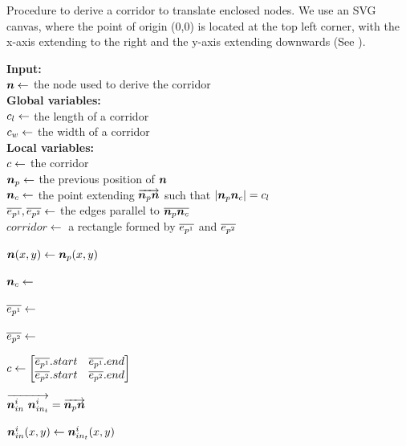 \begin{algorithm}[tb!]
    \caption{Procedure to derive a corridor to translate enclosed nodes. We use an SVG canvas, where the point of origin (0,0) is located at the top left corner, with the x-axis extending to the right and the y-axis extending downwards (See ).}\label{alg:derive corridor}

    \textbf{Input:} \\
    $ \bm{n} \gets $ the node used to derive the corridor \\

    \textbf{Global variables:} \\
    $ c_l \gets $ the length of a corridor \\
    $ c_w \gets $ the width of a corridor \\

    \textbf{Local variables:} \\
    $ c \gets $ the corridor \\
    $ \bm{n}_{p} \gets $ the previous position of $ \bm{n} $ \\
    $ \bm{n}_c \gets $ the point extending $ \protect\overrightarrow{\bm{n}_{p}\bm{n}} $ such that $ \lvert \bm{n}_{p}\bm{n}_c \rvert = c_l $\\
    $ \protect\overline{e_{p^1}}, \protect\overline{e_{p^2}} \gets $ the edges parallel to $ \protect\overline{\bm{n}_{p}\bm{n}_c} $ \\
    $ corridor \gets $ a rectangle formed by $ \protect\overline{e_{p^1}} $ and $ \protect\overline{e_{p^2}} $ \\

    \begin{algorithmic}[1]
            \State $ \bm{n}(x,y) \gets \bm{n}_{p}(x,y) $

            \State $ \bm{n}_c \gets $ 

            \State $ \protect\overline{e_{p^1}} \gets $ 

            \State $ \protect\overline{e_{p^2}} \gets $ 

            \State $ \Corridor \gets
                \begin{bmatrix}
                    \EdgeParallelA.start &
                    \EdgeParallelA.end \\

                    \EdgeParallelB.start &
                    \EdgeParallelB.end \\
                \end{bmatrix} $


                \State $ \protect\overrightarrow{\bm{n}_{in}^i ~\bm{n}_{in_t}^i} = \protect\overrightarrow{\bm{n}_{p}\bm{n}} $

                \State $ \bm{n}_{in}^i(x,y) \gets \bm{n}_{in_t}^i(x,y) $

            \EndFor
        \EndProcedure
    \end{algorithmic}
\end{algorithm}

